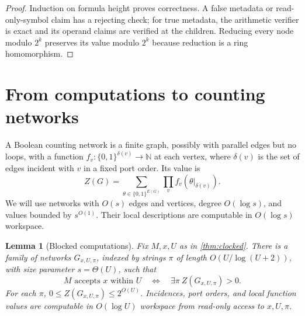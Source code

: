 \documentclass[11pt]{article}
\newtheorem{lemma}[theorem]{Lemma}
\theoremstyle{definition}
\theoremstyle{remark}
\newcommand{\N}{\mathbb N}
\begin{document}
\begin{proof}
Induction on formula height proves correctness. A false metadata or read-only-symbol claim has a rejecting check; for true metadata, the arithmetic verifier is exact and its operand claims are verified at the children. Reducing every node modulo $2^k$ preserves its value modulo $2^k$ because reduction is a ring homomorphism.
\end{proof}

\section{From computations to counting networks}\label{sec:blocking}

A Boolean counting network is a finite graph, possibly with parallel edges but no loops, with a function $f_v:\{0,1\}^{\delta(v)}\to\N$ at each vertex, where $\delta(v)$ is the set of edges incident with $v$ in a fixed port order. Its value is
\begin{equation}\label{eq:network}
 Z(G)=\sum_{\theta\in\{0,1\}^{E(G)}}\prod_v f_v(\theta|_{\delta(v)}).
\end{equation}
We will use networks with $O(s)$ edges and vertices, degree $O(\log s)$, and values bounded by $s^{O(1)}$. Their local descriptions are computable in $O(\log s)$ workspace.

\begin{lemma}[Blocked computations]\label{lem:block}
Fix $M,x,U$ as in \cref{thm:clocked}. There is a family of networks $G_{x,U,\pi}$, indexed by strings $\pi$ of length $O(U/\log(U+2))$, with size parameter $s=\Theta(U)$, such that
\[
 M\text{ accepts }x\text{ within }U
 \quad\Longleftrightarrow\quad
 \exists\pi\ Z(G_{x,U,\pi})>0.
\]
For each $\pi$, $0\le Z(G_{x,U,\pi})\le2^{O(U)}$. Incidences, port orders, and local function values are computable in $O(\log U)$ workspace from read-only access to $x,U,\pi$.
\end{lemma}
\end{document}
